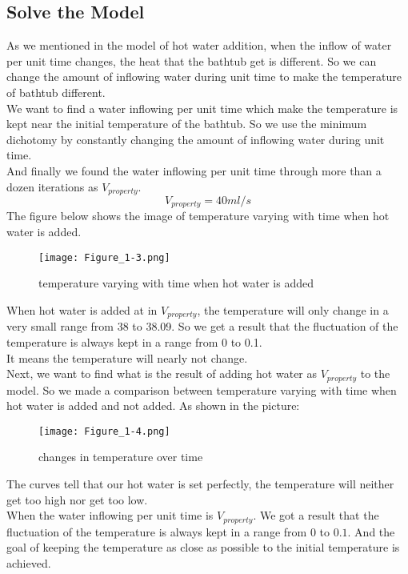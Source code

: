 \documentclass{mcmthesis}
\begin{document}
\subsection{Solve the Model}%
\indent As we mentioned in the model of hot water addition, when the inflow of water per unit time changes, the heat that the bathtub get is different. So we can change the amount of inflowing water during unit time to make the temperature of bathtub different.\\ 
\indent We want to find a water inflowing per unit time which make the temperature is kept near the initial temperature of the bathtub. 
So we use the minimum dichotomy by constantly changing the amount of inflowing water during unit time. \\			
\indent And finally we found the water inflowing per unit time through more than a dozen iterations as $V_{property}$.\\
\begin{equation}
	V_{property}=40ml/s
\end{equation}
\indent The figure below shows the image of temperature varying with time when hot water is added.
\begin{figure}[H]	%
\centerline{\texttt{[image: Figure\_1-3.png]}}
\caption{temperature varying with time when hot water is added}
\label{oval}	
\end{figure}
\indent When hot water is added at in $V_{property}$, the temperature will only change in a very small range from 38 to 38.09. So we get a result that the fluctuation of the temperature is always kept in a range from 0 to 0.1. \\
\indent It means the temperature will nearly not change.\\
\indent Next, we want to find what is the result of adding hot water as $V_{property}$ to the model. So we made a comparison between temperature varying with time when hot water is added and not added. As shown in the picture:
\begin{figure}[H]	%
\centerline{\texttt{[image: Figure\_1-4.png]}}
\caption{changes in temperature over time}
\label{oval}	
\end{figure}
\indent The curves tell that our hot water is set perfectly, the temperature will neither get too high nor get too low. \\
\indent When the water inflowing per unit time is $V_{property}$. We got a result that the fluctuation of the temperature is always kept in a range from $0$ to $0.1$. And the goal of keeping the temperature as close as possible to the initial temperature is achieved.
\end{document}
